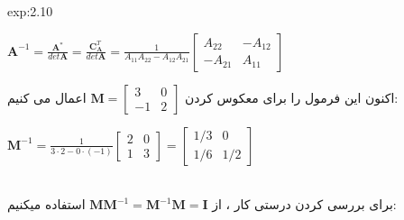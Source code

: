 {\begin{spacing}{1.5}
\begin{example}{exp:2.10}
            \begin{center}
                $\textbf{A}^{-1}=\frac{\displaystyle \textbf{A}^{*}}{\displaystyle det\textbf{A}}=\frac{\displaystyle \textbf{C}^{T}_{\textbf{A}}}{\displaystyle det\textbf{A}}=\frac{\displaystyle 1}{\displaystyle A_{11}A_{22}-A_{12}A_{21}}\begin{bmatrix}
                                                                                                                                                                                                                                                   A_{22}  & -A_{12} \\
                                                                                                                                                                                                                                                   -A_{21} & A_{11}
                \end{bmatrix}$
            \end{center}

            اکنون این فرمول را برای معکوس کردن $\textbf{M}=\begin{bmatrix}
                                                               3  & 0 \\
                                                               -1 & 2
            \end{bmatrix}$ اعمال می کنیم:

            \begin{center}
                $\textbf{M}^{-1}=\frac{\displaystyle 1}{\displaystyle 3\cdot 2-0\cdot(-1)}\begin{bmatrix}
                                                                                              2 & 0 \\
                                                                                              1 & 3
                \end{bmatrix}=\begin{bmatrix}
                                  1/3 & 0   \\
                                  1/6 & 1/2
                \end{bmatrix}$
            \end{center}

            \\برای بررسی کردن درستی کار ، از $\textbf{M}\textbf{M}^{-1}=\textbf{M}^{-1}\textbf{M}=\textbf{I}$ استفاده میکنیم:


\end{example}
\end{spacing}}

